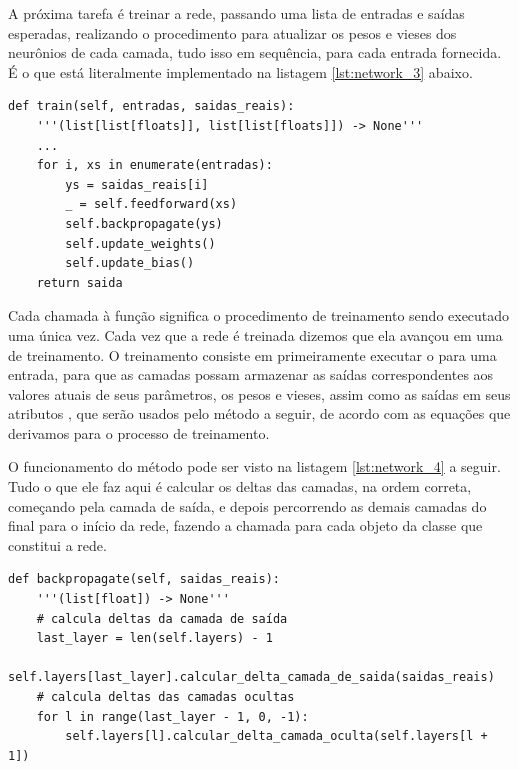 A próxima tarefa é treinar a rede, passando uma lista de entradas e saídas esperadas, realizando o procedimento  para atualizar os pesos e vieses dos neurônios de cada camada, tudo isso em sequência, para cada entrada fornecida. É o que está literalmente implementado na listagem \ref{lst:network_3} abaixo.
\newline
\estiloR
\begin{lstlisting}[caption={Trecho da classe \eng{Network}}, label={lst:network_3}, escapeinside={\%}]
def train(self, entradas, saidas_reais):
    '''(list[list[floats]], list[list[floats]]) -> None'''
    ...
    for i, xs in enumerate(entradas):
        ys = saidas_reais[i]
        _ = self.feedforward(xs)
        self.backpropagate(ys)
        self.update_weights()
        self.update_bias()
	return saida
\end{lstlisting}


Cada chamada à função  significa o procedimento de treinamento sendo executado uma única vez. Cada vez que a rede é treinada dizemos que ela avançou em uma  de treinamento. O treinamento consiste em primeiramente executar o  para uma entrada, para que as camadas possam armazenar as saídas correspondentes aos valores atuais de seus parâmetros, os pesos e vieses, assim como as saídas em seus atributos , que serão usados pelo método  a seguir, de acordo com as equações que derivamos para o processo de treinamento.

O funcionamento do método  pode ser visto na listagem \ref{lst:network_4} a seguir. Tudo o que ele faz aqui é calcular os deltas das camadas, na ordem correta, começando pela camada de saída, e depois percorrendo as demais camadas do final para o início da rede, fazendo a chamada para cada objeto da classe  que constitui a rede.
\newline
\estiloR
\begin{lstlisting}[caption={Trecho da classe \eng{Network}}, label={lst:network_4}, escapeinside={\%}]
def backpropagate(self, saidas_reais):
    '''(list[float]) -> None'''
    # calcula deltas da camada de saída
    last_layer = len(self.layers) - 1
    self.layers[last_layer].calcular_delta_camada_de_saida(saidas_reais)
    # calcula deltas das camadas ocultas
    for l in range(last_layer - 1, 0, -1):
        self.layers[l].calcular_delta_camada_oculta(self.layers[l + 1])
\end{lstlisting}


